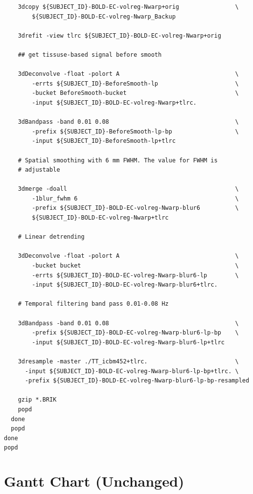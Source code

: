 \documentclass[12pt]{article}
\begin{document}
\begin{verbatim}
    3dcopy ${SUBJECT_ID}-BOLD-EC-volreg-Nwarp+orig                \
        ${SUBJECT_ID}-BOLD-EC-volreg-Nwarp_Backup

    3drefit -view tlrc ${SUBJECT_ID}-BOLD-EC-volreg-Nwarp+orig

    ## get tissuse-based signal before smooth

    3dDeconvolve -float -polort A                                 \
        -errts ${SUBJECT_ID}-BeforeSmooth-lp                      \
        -bucket BeforeSmooth-bucket                               \
        -input ${SUBJECT_ID}-BOLD-EC-volreg-Nwarp+tlrc.

    3dBandpass -band 0.01 0.08                                    \
        -prefix ${SUBJECT_ID}-BeforeSmooth-lp-bp                  \
        -input ${SUBJECT_ID}-BeforeSmooth-lp+tlrc

    # Spatial smoothing with 6 mm FWHM. The value for FWHM is
    # adjustable

    3dmerge -doall                                                \
        -1blur_fwhm 6                                             \
        -prefix ${SUBJECT_ID}-BOLD-EC-volreg-Nwarp-blur6          \
        ${SUBJECT_ID}-BOLD-EC-volreg-Nwarp+tlrc

    # Linear detrending

    3dDeconvolve -float -polort A                                 \
        -bucket bucket                                            \
        -errts ${SUBJECT_ID}-BOLD-EC-volreg-Nwarp-blur6-lp        \
        -input ${SUBJECT_ID}-BOLD-EC-volreg-Nwarp-blur6+tlrc.

    # Temporal filtering band pass 0.01-0.08 Hz

    3dBandpass -band 0.01 0.08                                    \
        -prefix ${SUBJECT_ID}-BOLD-EC-volreg-Nwarp-blur6-lp-bp    \
        -input ${SUBJECT_ID}-BOLD-EC-volreg-Nwarp-blur6-lp+tlrc

    3dresample -master ./TT_icbm452+tlrc.                         \
      -input ${SUBJECT_ID}-BOLD-EC-volreg-Nwarp-blur6-lp-bp+tlrc. \
      -prefix ${SUBJECT_ID}-BOLD-EC-volreg-Nwarp-blur6-lp-bp-resampled

    gzip *.BRIK
    popd
  done
  popd
done
popd

\end{verbatim}

\endgroup

\endgroup

\section{Gantt Chart (Unchanged)}%
\label{sec:gantt_chart_unchanged_}
\end{document}
